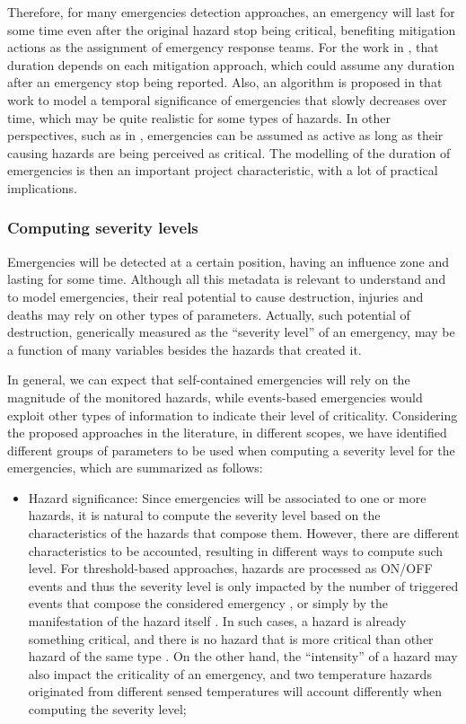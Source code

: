\begin{refsection}
Therefore, for many emergencies detection approaches, an emergency will last for some time even after the original hazard stop being critical, benefiting mitigation actions as the assignment of emergency response teams. For the work in \cite{emergenciesmetric2}, that duration depends on each mitigation approach, which could assume any duration after an emergency stop being reported. Also, an algorithm is proposed in that work to model a temporal significance of emergencies that slowly decreases over time, which may be quite realistic for some types of hazards. In other perspectives, such as in \cite{socialmedia1,emergenciesmetric4,emergenciestimemedia}, emergencies can be assumed as active as long as their causing hazards are being perceived as critical. The modelling of the duration of emergencies is then an important project characteristic, with a lot of practical implications.

\subsubsection{Computing severity levels} 

Emergencies will be detected at a certain position, having an influence zone and lasting for some time. Although all this metadata is relevant to understand and to model emergencies, their real potential to cause destruction, injuries and deaths may rely on other types of parameters. Actually, such potential of destruction, generically measured as the ``severity level'' of an emergency, may be a function of many variables besides the hazards that created it.

In general, we can expect that self-contained emergencies will rely on the magnitude of the monitored hazards, while events-based emergencies would exploit other types of information to indicate their level of criticality. Considering the proposed approaches in the literature, in different scopes, we have identified different groups of parameters to be used when computing a severity level for the emergencies, which are summarized as follows:

\begin{itemize}
    \item Hazard significance: Since emergencies will be associated to one or more hazards, it is natural to compute the severity level based on the characteristics of the hazards that compose them. However, there are different characteristics to be accounted, resulting in different ways to compute such level. For threshold-based approaches, hazards are processed as ON/OFF events and thus the severity level is only impacted by the number of triggered events that compose the considered emergency \cite{emergenciesmetric2}, or simply by the manifestation of the hazard itself \cite{emergenciesmetric4}. In such cases, a hazard is already something critical, and there is no hazard that is more critical than other hazard of the same type \cite{emergenciesmetric2}. On the other hand, the ``intensity'' of a hazard may also impact the criticality of an emergency, and two temperature hazards originated from different sensed temperatures will account differently when computing the severity level;
    

\end{itemize}
\end{refsection}
